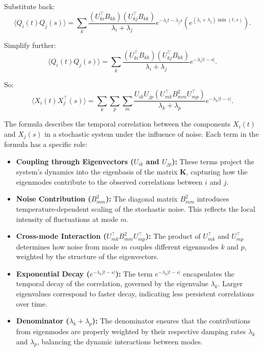 \documentclass[English, Lau, oneside]{sapthesis}
\begin{document}
Substitute back:
\[
\langle Q_i(t) Q_j(s) \rangle = \sum_k \frac{(U_{ki}^\top B_{kk}) (U_{kj}^\top B_{kk})}{\lambda_i + \lambda_j} e^{-\lambda_i t - \lambda_j s} \left( e^{(\lambda_i + \lambda_j) \min(t,s)} \right).
\]

Simplify further:
\[
\langle Q_i(t) Q_j(s) \rangle = \sum_k \frac{(U_{ki}^\top B_{kk}) (U_{kj}^\top B_{kk})}{\lambda_i + \lambda_j} e^{-\lambda_i |t-s|}.
\]

So:
\[
\langle X_i(t) X_j^\top(s) \rangle = \sum_k \sum_p \sum_m \frac{U_{ik} U_{jp} (U_{mk}^\top B_{mm}^2 U_{mp}^\top)}{\lambda_k + \lambda_p} e^{-\lambda_k |t-s|}.
\]

The formula describes the temporal correlation between the components \( X_i(t) \) and \( X_j(s) \) in a stochastic system under the influence of noise. Each term in the formula has a specific role:

\begin{itemize}
    \item \textbf{Coupling through Eigenvectors (\( U_{ik} \) and \( U_{jp} \)):}
    These terms project the system's dynamics into the eigenbasis of the matrix \( \mathbf{K} \), capturing how the eigenmodes contribute to the observed correlations between \( i \) and \( j \).

    \item \textbf{Noise Contribution (\( B_{mm}^2 \)):}
    The diagonal matrix \( B_{mm}^2 \) introduces temperature-dependent scaling of the stochastic noise. This reflects the local intensity of fluctuations at mode \( m \).

    \item \textbf{Cross-mode Interaction (\( U_{mk}^\top B_{mm}^2 U_{mp}^\top \)):}
    The product of \( U_{mk}^\top \) and \( U_{mp}^\top \) determines how noise from mode \( m \) couples different eigenmodes \( k \) and \( p \), weighted by the structure of the eigenvectors.

    \item \textbf{Exponential Decay (\( e^{-\lambda_k |t-s|} \)):}
    The term \( e^{-\lambda_k |t-s|} \) encapsulates the temporal decay of the correlation, governed by the eigenvalue \( \lambda_k \). Larger eigenvalues correspond to faster decay, indicating less persistent correlations over time.

    \item \textbf{Denominator (\( \lambda_k + \lambda_p \)):}
    The denominator ensures that the contributions from eigenmodes are properly weighted by their respective damping rates \( \lambda_k \) and \( \lambda_p \), balancing the dynamic interactions between modes.
\end{itemize}
\end{document}
